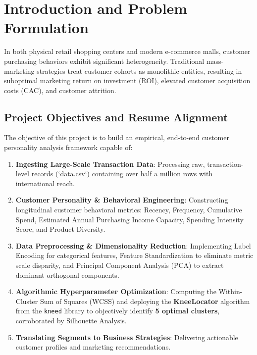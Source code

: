 \documentclass[11pt,a4paper]{article}
\begin{document}
\section{Introduction and Problem Formulation}

In both physical retail shopping centers and modern e-commerce malls, customer purchasing behaviors exhibit significant heterogeneity. Traditional mass-marketing strategies treat customer cohorts as monolithic entities, resulting in suboptimal marketing return on investment (ROI), elevated customer acquisition costs (CAC), and customer attrition.

\subsection{Project Objectives and Resume Alignment}
The objective of this project is to build an empirical, end-to-end customer personality analysis framework capable of:
\begin{enumerate}[leftmargin=*]
    \item \textbf{Ingesting Large-Scale Transaction Data}: Processing raw, transaction-level records (`data.csv`) containing over half a million rows with international reach.
    \item \textbf{Customer Personality \& Behavioral Engineering}: Constructing longitudinal customer behavioral metrics: Recency, Frequency, Cumulative Spend, Estimated Annual Purchasing Income Capacity, Spending Intensity Score, and Product Diversity.
    \item \textbf{Data Preprocessing \& Dimensionality Reduction}: Implementing Label Encoding for categorical features, Feature Standardization to eliminate metric scale disparity, and Principal Component Analysis (PCA) to extract dominant orthogonal components.
    \item \textbf{Algorithmic Hyperparameter Optimization}: Computing the Within-Cluster Sum of Squares (WCSS) and deploying the \textbf{KneeLocator} algorithm from the \texttt{kneed} library to objectively identify \textbf{5 optimal clusters}, corroborated by Silhouette Analysis.
    \item \textbf{Translating Segments to Business Strategies}: Delivering actionable customer profiles and marketing recommendations.
\end{enumerate}
\end{document}
